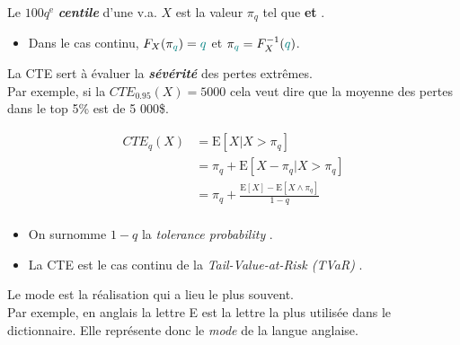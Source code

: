 \documentclass[10pt, french]{article}
\begin{document}
\begin{multicols*}{2}
\begin{definitionNOHFILL}[Centile]
Le $100q^{\text{e}}$ \textbf{\textit{centile}} d'une v.a. $X$ est la valeur $\pi_{q}$ tel que  \textbf{et} .\\

\begin{itemize}
	\item	Dans le cas continu, $F_{X}(\pi_{\textcolor{teal}{q}})	=	\textcolor{teal}{q}$ et $\pi_{\textcolor{teal}{q}}	=	F^{-1}_{X}(\textcolor{teal}{q})$.
\end{itemize}
\end{definitionNOHFILL}

\begin{definitionNOHFILL}
\begin{rappel_enhanced}[Contexte]
La CTE sert à évaluer la \textit{\textbf{sévérité}} des pertes extrêmes. \\

Par exemple, si la $CTE_{0.95}(X)	=	5000$ cela veut dire que la moyenne des pertes dans le top 5\% est de 5 000\$.
\end{rappel_enhanced}

\begin{align*}
	CTE_{q}(X)
	&=	\text{E}[X | X > \pi_{q}]	\\
	&=	\pi_{q} + \text{E}[X - \pi_{q} | X > \pi_{q}]		\\
	&=	\pi_{q} + \frac{\text{E}[X]	- \text{E}[X \wedge \pi_{q}]	}{1 - q}	\\
\end{align*}

\begin{itemize}
	\item	On surnomme $1	-	q$ la \og \textit{tolerance probability} \fg{}.
	\item	La CTE est le cas continu de la \og \textit{Tail-Value-at-Risk (TVaR)} \fg{}.
\end{itemize}
\end{definitionNOHFILL}


\begin{definitionNOHFILL}[Mode]
\begin{rappel_enhanced}[Contexte]
Le mode est la réalisation qui a lieu le plus souvent. \\
Par exemple, en anglais la lettre E est la lettre la plus utilisée dans le dictionnaire. Elle représente donc le \textit{mode} de la langue anglaise.
\end{rappel_enhanced}


\end{definitionNOHFILL}
\end{multicols*}
\end{document}
